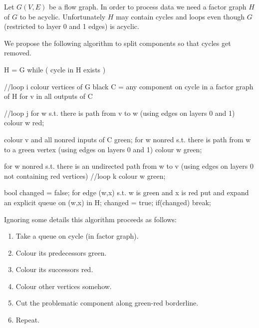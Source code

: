 Let $G(V,E)$ be a flow graph. In order to process data we need a factor graph $H$ of $G$ to be acyclic. Unfortunately $H$ may contain cycles and loops even though $G$ (restricted to layer 0 and 1 edges) is acyclic. 


We propose the following algorithm to split components so that cycles get removed.

\begin{samepage}
\begin{code}
  H = G
while ( cycle in H exists )     
{ //loop i
  colour vertices of G black
  C = any component on cycle in a factor graph of H
  for v in all outputs of C     
  { //loop j
    for w s.t. there is path from v to w 
    (using edges on layers 0 and 1)
    {
      colour w red;
    }

    colour v and all nonred inputs of C green;
    for w nonred s.t. there is path from w to a green vertex
    (using edges on layers 0 and 1)
    {
      colour w green;
    }

    for w nonred s.t. there is an undirected path from w to v
    (using edges on layers 0 not containing red vertices)
    { //loop k
      colour w green;
    }

    bool changed = false;
    for edge (w,x) s.t. w is green and x is red
    {
      put and expand an explicit queue on (w,x) in H;
      changed = true;
    }
    if(changed)
      break;
  }
}
\end{code}
\end{samepage}

Ignoring some details this algorithm proceeds as follows:
\begin{enumerate}
  \item Take a queue on cycle (in factor graph).
  \item Colour its predecessors green.
  \item Colour its successors red.
  \item Colour other vertices somehow.
  \item Cut the problematic component along green-red borderline.
  \item Repeat.
\end{enumerate}

